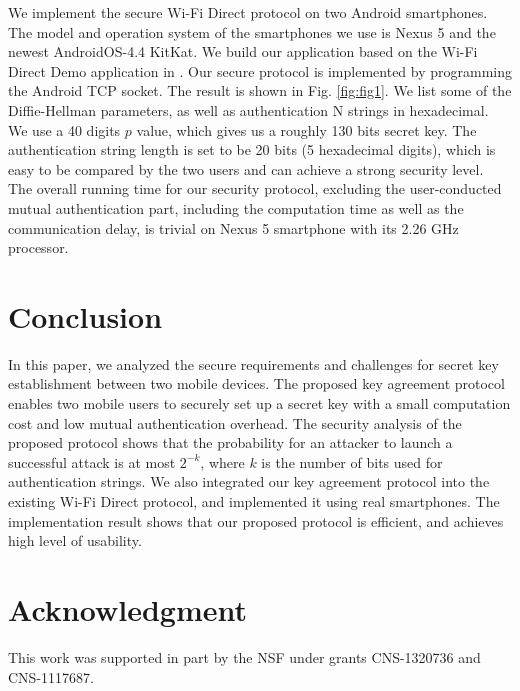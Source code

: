 \documentclass[conference]{IEEEtran}
\begin{document}
We implement the secure Wi-Fi Direct protocol on two Android smartphones. The model and operation system of the smartphones we use is Nexus 5 and the newest AndroidOS-4.4 KitKat. We build our application based on the Wi-Fi Direct Demo application in \cite{demo}. Our secure protocol is implemented by programming the Android TCP socket.  The result is shown in Fig. \ref{fig:fig1}. We list some of the Diffie-Hellman parameters, as well as authentication $\mathrm{N}$ strings in hexadecimal. We use a 40 digits $p$ value, which gives us a roughly 130 bits secret key. The authentication string length is set to be 20 bits (5 hexadecimal digits), which is easy to be compared by the two users and can achieve a strong security level. The overall running time for our security protocol, excluding the user-conducted mutual authentication part, including the computation time as well as the communication delay, is trivial on Nexus 5 smartphone with its 2.26 GHz processor.

 






\section{Conclusion \label{sec5}}

In this paper, we analyzed the secure requirements and challenges for secret key establishment between two mobile devices. The proposed key agreement protocol enables two mobile users to securely set up a secret key with a small computation cost and low mutual authentication overhead. The security analysis of the proposed protocol shows that the probability for an attacker to launch a successful attack is at most $2^{-k}$, where $k$ is the number of bits used for authentication strings. We also integrated our key agreement protocol into the existing Wi-Fi Direct protocol, and implemented it using real smartphones. The implementation result shows that our proposed protocol is efficient, and achieves high level of usability.
 
\section*{Acknowledgment}
This work was supported in part by the NSF under grants CNS-1320736 and CNS-1117687.
\end{document}
